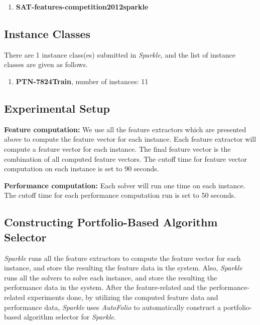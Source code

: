 \documentclass[british]{article}
\begin{document}
\begin{enumerate}
\item \textbf{SAT-features-competition2012\textunderscore sparkle}

\end{enumerate}

\subsection{Instance Classes}
\label{sec:Instance_Classes}
There are 1 instance class(es) submitted in \emph{Sparkle}, and the list of instance classes are given as follows.

\begin{enumerate}
\item \textbf{PTN-7824\textunderscore Train}, number of instances: 11

\end{enumerate}

\subsection{Experimental Setup}
\label{sec:Experimental_Setup}

\textbf{Feature computation:} We use all the feature extractors which are presented above to compute the feature vector for each instance. Each feature extractor will compute a feature vector for each instance. The final feature vector is the combination of all computed feature vectors. The cutoff time for feature vector computation on each instance is set to 90 seconds.

\textbf{Performance computation:} Each solver will run one time on each instance. The cutoff time for each performance computation run is set to 50 seconds.

\subsection{Constructing Portfolio-Based Algorithm Selector}
\label{sec:Portfolio}

\emph{Sparkle} runs all the feature extractors to compute the feature vector for each instance, and store the resulting the feature data in the system. Also, \emph{Sparkle} runs all the solvers to solve each instance, and store the resulting the performance data in the system. After the feature-related and the performance-related experiments done, by utilizing the computed feature data and performance data, \emph{Sparkle} uses \emph{AutoFolio} \cite{LinEtAl15} to automatically construct a portfolio-based algorithm selector for \emph{Sparkle}.
\end{document}
